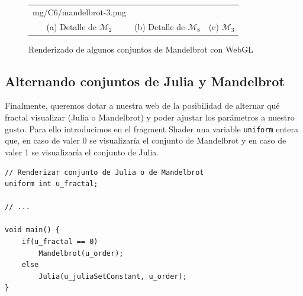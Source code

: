 \begin{figure}[ht]
\begin{tabular}{ccc}
mg/C6/mandelbrot-3.png} \\
    (a) Detalle de $\mathcal{M}_2$ & (b) Detalle de $\mathcal{M}_8$ & (c) $\mathcal{M}_3$ \\[6pt]
    \end{tabular}
    \caption{Renderizado de algunos conjuntos de Mandelbrot con WebGL}
    \label{fig:mandelbrot-webgl}
\end{figure}

\subsection{Alternando conjuntos de Julia y Mandelbrot}
\label{subsection:alternando}

Finalmente, queremos dotar a nuestra web de la posibilidad de alternar qué fractal visualizar (Julia o Mandelbrot) y poder ajustar los parámetros a nuestro gusto. Para ello introducimos en el fragment Shader una variable \verb|uniform| entera que, en caso de valer 0 se visualizaría el conjunto de Mandelbrot y en caso de valer 1 se visualizaría el conjunto de Julia.

\begin{lstlisting}
// Renderizar conjunto de Julia o de Mandelbrot
uniform int u_fractal;

// ... 

void main() {
    if(u_fractal == 0)
        Mandelbrot(u_order);
    else
        Julia(u_juliaSetConstant, u_order);
}
\end{lstlisting}